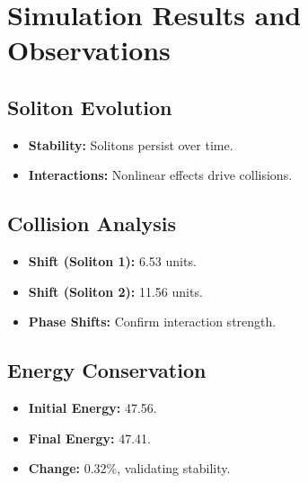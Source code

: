 \documentclass{article}
\begin{document}
\section{Simulation Results and Observations}
\subsection{Soliton Evolution}
\begin{itemize}
    \item \textbf{Stability:} Solitons persist over time.
    \item \textbf{Interactions:} Nonlinear effects drive collisions.
\end{itemize}

\subsection{Collision Analysis}
\begin{itemize}
    \item \textbf{Shift (Soliton 1):} 6.53 units.
    \item \textbf{Shift (Soliton 2):} 11.56 units.
    \item \textbf{Phase Shifts:} Confirm interaction strength.
\end{itemize}

\subsection{Energy Conservation}
\begin{itemize}
    \item \textbf{Initial Energy:} 47.56.
    \item \textbf{Final Energy:} 47.41.
    \item \textbf{Change:} 0.32\%, validating stability.
\end{itemize}
\end{document}
